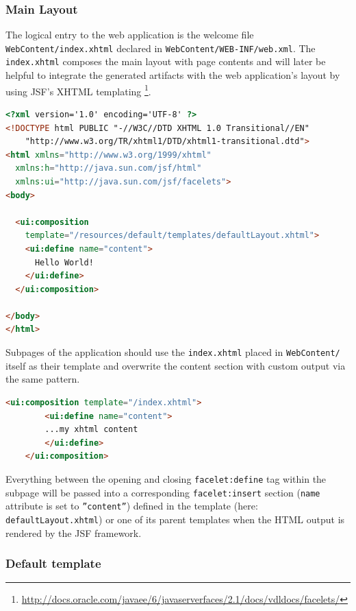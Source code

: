 \subsubsection{Main Layout}
\label{subsec:referenceMainLayout} 

The logical entry to the web application is the welcome file
\texttt{WebContent/index.xhtml} declared in
\texttt{WebContent/WEB-INF/web.xml}. The \texttt{index.xhtml} composes the
main layout with page contents and will later be helpful to integrate the
generated artifacts with the web application's layout by using JSF's XHTML
templating
\footnote{\url{http://docs.oracle.com/javaee/6/javaserverfaces/2.1/docs/vdldocs/facelets/}}.

\begin{lstlisting}[language=HTML]
<?xml version='1.0' encoding='UTF-8' ?>
<!DOCTYPE html PUBLIC "-//W3C//DTD XHTML 1.0 Transitional//EN" 
    "http://www.w3.org/TR/xhtml1/DTD/xhtml1-transitional.dtd">
<html xmlns="http://www.w3.org/1999/xhtml"
  xmlns:h="http://java.sun.com/jsf/html"
  xmlns:ui="http://java.sun.com/jsf/facelets">
<body>

  <ui:composition
    template="/resources/default/templates/defaultLayout.xhtml">
    <ui:define name="content">
      Hello World!
    </ui:define>
  </ui:composition>

</body>
</html>
\end{lstlisting}
 
Subpages of the application should use the \texttt{index.xhtml} placed in
\texttt{WebContent/} itself as their template and overwrite the content section
with custom output via the same pattern.

\begin{lstlisting}[language=HTML] 
	<ui:composition template="/index.xhtml">
  		<ui:define name="content">
  		...my xhtml content
  		</ui:define>
 	</ui:composition>
\end{lstlisting}

Everything between the opening and closing \texttt{facelet:define} tag within
the subpage will be passed into a corresponding \texttt{facelet:insert} section
(\texttt{name} attribute is set to \texttt{''content''}) defined in the template
(here: \texttt{defaultLayout.xhtml}) or one of its parent templates when the HTML output is rendered by the JSF framework.

\subsubsection*{Default template}
\label{sec:template}

